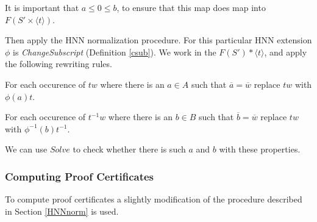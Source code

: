 \documentclass[11pt]{article} %
\theoremstyle{definition}
\theoremstyle{definition}
\theoremstyle{definition}
\theoremstyle{definition}
\theoremstyle{definition}
\newtheorem{defn}[theorem]{Definition}
\theoremstyle{definition}
\begin{document}
It is important that $a \le 0 \le b$, to ensure that this map does map into
$F(S' \times \langle t \rangle)$.

Then apply the HNN normalization procedure. For this particular HNN extension
$\phi$ is \textit{ChangeSubscript} (Definition \ref{csub}).
We work in the $F(S') \ast \langle t \rangle$, and apply the following rewriting rules.

For each occurence of $tw$ where there is an $a \in A$ such that
$\overline{a} = \overline{w}$ replace $tw$ with $\phi(a)t$.

For each occurence of $t^{-1}w$ where there is an $b \in B$ such that
$\overline{b} = \overline{w}$ replace $tw$ with $\phi^{-1}(b)t^{-1}$.

We can use $\textit{Solve}$ to check whether there is such $a$ and $b$ with
these properties.





\subsubsection{Computing Proof Certificates}\label{HNNPC}

To compute proof certificates a slightly modification of the procedure described in Section
\ref{HNNnorm} is used.
\end{document}
